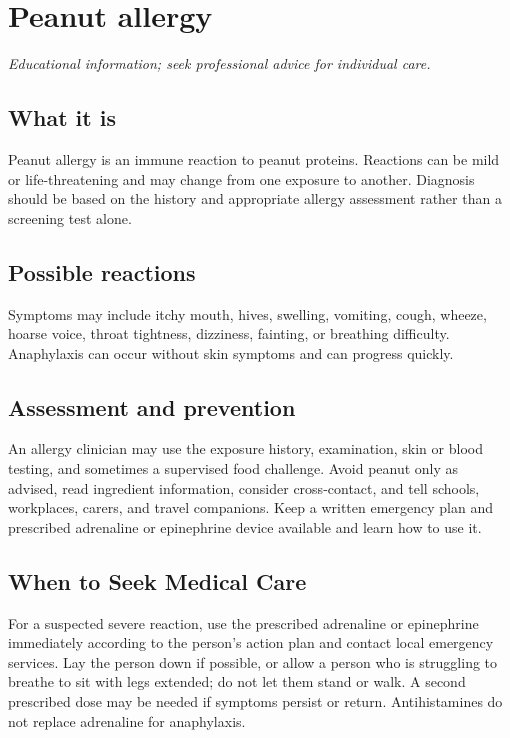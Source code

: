 \chapter{Peanut allergy}

\medskip
\noindent\textit{Educational information; seek professional advice for individual care.}

\section*{What it is}
Peanut allergy is an immune reaction to peanut proteins. Reactions can be mild or life-threatening and may change from one exposure to another. Diagnosis should be based on the history and appropriate allergy assessment rather than a screening test alone.

\section*{Possible reactions}
Symptoms may include itchy mouth, hives, swelling, vomiting, cough, wheeze, hoarse voice, throat tightness, dizziness, fainting, or breathing difficulty. Anaphylaxis can occur without skin symptoms and can progress quickly.

\section*{Assessment and prevention}
An allergy clinician may use the exposure history, examination, skin or blood testing, and sometimes a supervised food challenge. Avoid peanut only as advised, read ingredient information, consider cross-contact, and tell schools, workplaces, carers, and travel companions. Keep a written emergency plan and prescribed adrenaline or epinephrine device available and learn how to use it.

\section*{When to Seek Medical Care}
For a suspected severe reaction, use the prescribed adrenaline or epinephrine immediately according to the person’s action plan and contact local emergency services. Lay the person down if possible, or allow a person who is struggling to breathe to sit with legs extended; do not let them stand or walk. A second prescribed dose may be needed if symptoms persist or return. Antihistamines do not replace adrenaline for anaphylaxis.

